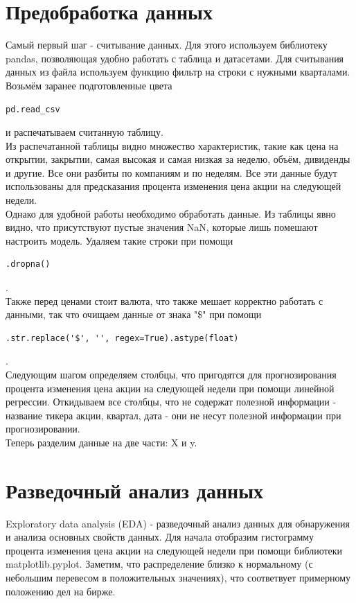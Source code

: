 \documentclass{article}
\begin{document}
\section{Предобработка данных}


Самый первый шаг - считывание данных. Для этого используем библиотеку pandas, позволяющая удобно работать с таблица и датасетами. Для считывания данных из файла используем функцию фильтр на строки с нужными кварталами. Возьмём заранее подготовленные цвета 
\begin{lstlisting}
pd.read_csv
\end{lstlisting} и распечатываем считанную таблицу.  
\\
 
Из распечатанной таблицы видно множество характеристик, такие как цена на открытии, закрытии, самая высокая и самая низкая за неделю, объём, дивиденды и другие. Все они разбиты по компаниям и по неделям.  Все эти данные будут использованы для предсказания процента изменения цена акции на следующей недели. 
\\
 
Однако для удобной работы необходимо обработать данные. Из таблицы явно видно, что присутствуют пустые значения NaN, которые лишь помешают настроить модель. Удаляем такие строки при помощи \begin{lstlisting}
.dropna()
\end{lstlisting} .  
\\

Также перед ценами стоит валюта, что также мешает корректно работать с данными, так что очищаем данные от знака "\$" при помощи \begin{lstlisting}
.str.replace('$', '', regex=True).astype(float)
\end{lstlisting}. 
\\
 
Следующим шагом определяем столбцы, что пригодятся для прогнозирования процента изменения цена акции на следующей недели при помощи линейной регрессии. Откидываем все столбцы, что не содержат полезной информации - название тикера акции, квартал, дата - они не несут полезной информации при прогнозировании.  
\\
 
Теперь разделим данные на две части: X и y. 
\\
\section{Разведочный анализ данных}
Exploratory data analysis (EDA) - разведочный анализ данных для обнаружения и анализа основных свойств данных. Для начала отобразим гистограмму процента изменения цена акции на следующей недели при помощи библиотеки matplotlib.pyplot. Заметим, что распределение близко к нормальному (с небольшим перевесом в положительных значениях), что соответвует примерному положению дел на бирже. 
\\
 
\end{document}
